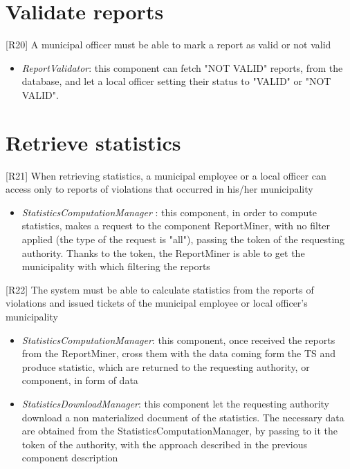 		\section{Validate reports}
			{[R20]} A municipal officer must be able to mark a report as valid or not valid
				\begin{itemize}
					\item \textit{ReportValidator}: this component can fetch "NOT VALID" reports, from the database, and let a local officer setting their status to "VALID" or "NOT VALID".
				\end{itemize}
		\section{Retrieve statistics}
			{[R21]} When retrieving statistics, a municipal employee or a local officer can access only to reports of violations that occurred in his/her municipality
				\begin{itemize}
					\item \textit{StatisticsComputationManager} : this component, in order to compute statistics, makes a request to the component ReportMiner, with no filter applied (the type of the request is "all"), passing the token of the requesting authority. Thanks to the token, the ReportMiner is able to get the municipality with which filtering the reports
				\end{itemize}
			{[R22]} The system must be able to calculate statistics from the reports of violations and issued tickets of the municipal employee or local officer's municipality
				\begin{itemize}
					\item \textit{StatisticsComputationManager}: this component, once received the reports from the ReportMiner, cross them with the data coming form the TS and produce statistic, which are returned to the requesting authority, or component, in form of data
					\item \textit{StatisticsDownloadManager}: this component let the requesting authority download a non materialized document of the statistics. The necessary data are obtained from the StatisticsComputationManager, by passing to it the token of the authority, with the approach described in the previous component description
				\end{itemize}
				
